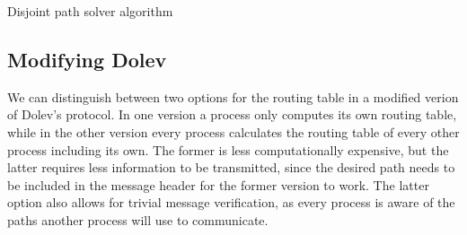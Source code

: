\begin{algorithm}[h]
  \DontPrintSemicolon
  
  
  
 \caption{Disjoint path solver algorithm}
 \label{contr:disjoint-path}
\end{algorithm}

\label{contr:modifying-dolev}
\subsection{Modifying Dolev}
We can distinguish between two options for the routing table in a modified verion of Dolev's protocol. 
In one version a process only computes its own routing table, while in the other version every process calculates the routing table of every other process including its own. The former is less computationally expensive, but the latter requires less information to be transmitted, since the desired path needs to be included in the message header for the former version to work. The latter option also allows for trivial message verification, as every process is aware of the paths another process will use to communicate. 


